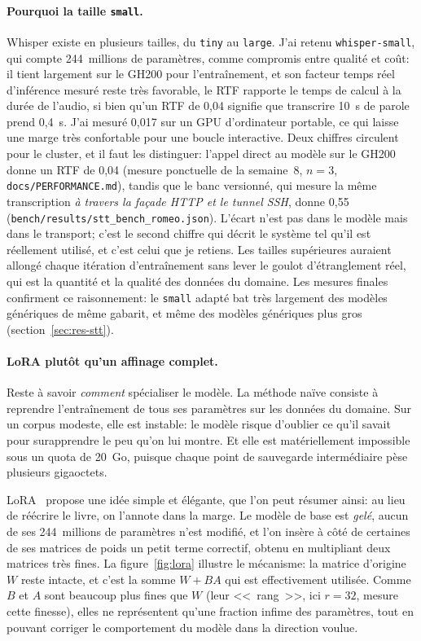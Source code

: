 \documentclass[11pt,a4paper]{article}
\begin{document}
\paragraph{Pourquoi la taille \texttt{small}.} Whisper existe en plusieurs tailles, du \texttt{tiny} au \texttt{large}. J'ai retenu \texttt{whisper-small}, qui compte 244~millions de paramètres, comme compromis entre qualité et coût: il tient largement sur le GH200 pour l'entraînement, et son facteur temps réel d'inférence mesuré reste très favorable, le RTF rapporte le temps de calcul à la durée de l'audio, si bien qu'un RTF de 0,04 signifie que transcrire 10~s de parole prend 0,4~s. J'ai mesuré 0,017 sur un GPU d'ordinateur portable, ce qui laisse une marge très confortable pour une boucle interactive. Deux chiffres circulent pour le cluster, et il faut les distinguer: l'appel direct au modèle sur le GH200 donne un RTF de 0,04 (mesure ponctuelle de la semaine~8, $n = 3$, \texttt{docs/PERFORMANCE.md}), tandis que le banc versionné, qui mesure la même transcription \emph{à travers la façade HTTP et le tunnel SSH}, donne 0,55 (\texttt{bench/results/stt\_bench\_romeo.json}). L'écart n'est pas dans le modèle mais dans le transport; c'est le second chiffre qui décrit le système tel qu'il est réellement utilisé, et c'est celui que je retiens. Les tailles supérieures auraient allongé chaque itération d'entraînement sans lever le goulot d'étranglement réel, qui est la quantité et la qualité des données du domaine. Les mesures finales confirment ce raisonnement: le \texttt{small} adapté bat très largement des modèles génériques de même gabarit, et même des modèles génériques plus gros (section~\ref{sec:res-stt}). 

\paragraph{LoRA plutôt qu'un affinage complet.} Reste à savoir \emph{comment} spécialiser le modèle. La méthode naïve consiste à reprendre l'entraînement de tous ses paramètres sur les données du domaine. Sur un corpus modeste, elle est instable: le modèle risque d'oublier ce qu'il savait pour surapprendre le peu qu'on lui montre. Et elle est matériellement impossible sous un quota de 20~Go, puisque chaque point de sauvegarde intermédiaire pèse plusieurs gigaoctets.

LoRA~\cite{lora} propose une idée simple et élégante, que l'on peut résumer ainsi: au lieu de réécrire le livre, on l'annote dans la marge. Le modèle de base est \emph{gelé}, aucun de ses 244~millions de paramètres n'est modifié, et l'on insère à côté de certaines de ses matrices de poids un petit terme correctif, obtenu en multipliant deux matrices très fines. La figure~\ref{fig:lora} illustre le mécanisme: la matrice d'origine $W$ reste intacte, et c'est la somme $W + BA$ qui est effectivement utilisée. Comme $B$ et $A$ sont beaucoup plus fines que $W$ (leur <<~rang~>>, ici $r = 32$, mesure cette finesse), elles ne représentent qu'une fraction infime des paramètres, tout en pouvant corriger le comportement du modèle dans la direction voulue. 
\end{document}
